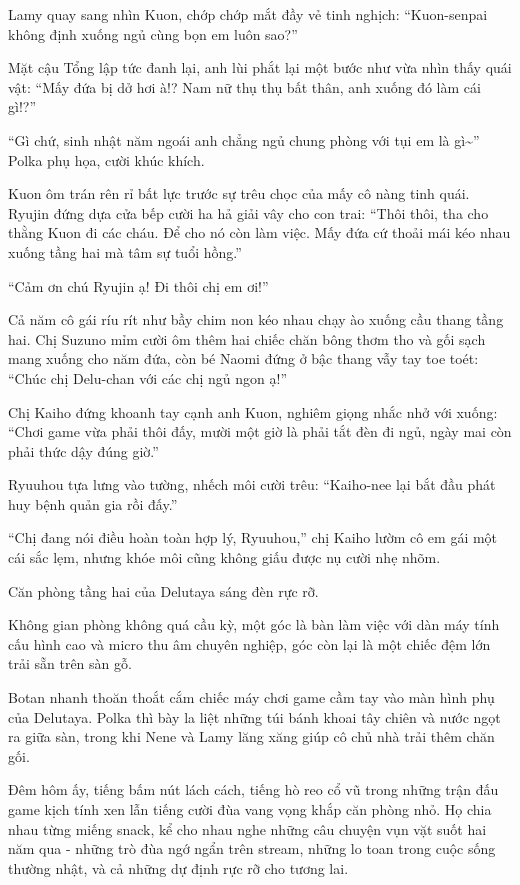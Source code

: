\documentclass[../main.tex]{subfiles}
\begin{document}
Lamy quay sang nhìn Kuon, chớp chớp mắt đầy vẻ tinh nghịch: ``Kuon-senpai không định xuống ngủ cùng bọn em luôn sao?''

Mặt cậu Tổng lập tức đanh lại, anh lùi phắt lại một bước như vừa nhìn thấy quái vật: ``Mấy đứa bị dở hơi à!? Nam nữ thụ thụ bất thân, anh xuống đó làm cái gì!?''

``Gì chứ, sinh nhật năm ngoái anh chẳng ngủ chung phòng với tụi em là gì\~{}'' Polka phụ họa, cười khúc khích.

Kuon ôm trán rên rỉ bất lực trước sự trêu chọc của mấy cô nàng tinh quái. Ryujin đứng dựa cửa bếp cười ha hả giải vây cho con trai: ``Thôi thôi, tha cho thằng Kuon đi các cháu. Để cho nó còn làm việc. Mấy đứa cứ thoải mái kéo nhau xuống tầng hai mà tâm sự tuổi hồng.''

``Cảm ơn chú Ryujin ạ! Đi thôi chị em ơi!''

Cả năm cô gái ríu rít như bầy chim non kéo nhau chạy ào xuống cầu thang tầng hai. Chị Suzuno mỉm cười ôm thêm hai chiếc chăn bông thơm tho và gối sạch mang xuống cho năm đứa, còn bé Naomi đứng ở bậc thang vẫy tay toe toét: ``Chúc chị Delu-chan với các chị ngủ ngon ạ!''

Chị Kaiho đứng khoanh tay cạnh anh Kuon, nghiêm giọng nhắc nhở với xuống: ``Chơi game vừa phải thôi đấy, mười một giờ là phải tắt đèn đi ngủ, ngày mai còn phải thức dậy đúng giờ.''

Ryuuhou tựa lưng vào tường, nhếch môi cười trêu: ``Kaiho-nee lại bắt đầu phát huy bệnh quản gia rồi đấy.''

``Chị đang nói điều hoàn toàn hợp lý, Ryuuhou,'' chị Kaiho lườm cô em gái một cái sắc lẹm, nhưng khóe môi cũng không giấu được nụ cười nhẹ nhõm.

\ct

Căn phòng tầng hai của Delutaya sáng đèn rực rỡ.

Không gian phòng không quá cầu kỳ, một góc là bàn làm việc với dàn máy tính cấu hình cao và micro thu âm chuyên nghiệp, góc còn lại là một chiếc đệm lớn trải sẵn trên sàn gỗ.

Botan nhanh thoăn thoắt cắm chiếc máy chơi game cầm tay vào màn hình phụ của Delutaya. Polka thì bày la liệt những túi bánh khoai tây chiên và nước ngọt ra giữa sàn, trong khi Nene và Lamy lăng xăng giúp cô chủ nhà trải thêm chăn gối.

Đêm hôm ấy, tiếng bấm nút lách cách, tiếng hò reo cổ vũ trong những trận đấu game kịch tính xen lẫn tiếng cười đùa vang vọng khắp căn phòng nhỏ. Họ chia nhau từng miếng snack, kể cho nhau nghe những câu chuyện vụn vặt suốt hai năm qua - những trò đùa ngớ ngẩn trên stream, những lo toan trong cuộc sống thường nhật, và cả những dự định rực rỡ cho tương lai.
\end{document}
